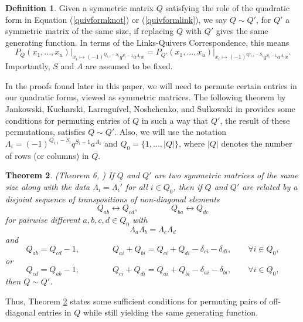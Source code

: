 \documentclass[11pt]{amsart}
\theoremstyle{plain}
\newtheorem{theoremN}{Theorem}[section]
\theoremstyle{definition}
\newtheorem{definitionN}[theoremN]{Definition}
\theoremstyle{remark}
\begin{document}
\begin{definitionN}
    Given a symmetric matrix $Q$ satisfying the role of the quadratic form in Equation (\ref{quivformknot}) or (\ref{quivformlink}), we say $Q\sim Q'$, for $Q'$ a symmetric matrix of the same size, if replacing $Q$ with $Q'$ gives the same generating function. In terms of the Links-Quivers Correspondence, this means
    \begin{equation}
     P_Q(x_1,...,x_u)\bigg|_{x_i\mapsto (-1)^{Q_{i,i}-S_i}q^{S_i-1}a^{A_i}x} = P_{Q'}(x_1,...,x_u)\bigg|_{x_i\mapsto (-1)^{Q'_{i,i}-S_i}q^{S_i-1}a^{A_i}x}.   
    \end{equation}
    Importantly, $S$ and $A$ are assumed to be fixed.
\end{definitionN}

In the proofs found later in this paper, we will need to permute certain entries in our quadratic forms, viewed as symmetric matrices.
The following theorem by Jankowski, Kucharski, Larragu\'ivel, Noshchenko, and Su\l{}kowski in \cite{JKLN21} provides some conditions for permuting entries of $Q$ in such a way that $Q'$, the result of these permutations, satisfies $Q\sim Q'$. Also, we will use the notation $\Lambda_i=(-1)^{Q_{i,i}-S_i}q^{S_i-1}a^{A_i}$ and $Q_0=\{1,...,|Q|\}$, where $|Q|$ denotes the number of rows (or columns) in $Q$.

\begin{theoremN}
\label{permthm}
    (Theorem 6, \cite{JKLN21}) If $Q$ and $Q'$ are two symmetric matrices of the same size along with the data $\Lambda_i=\Lambda_i'$ for all $i\in Q_0$, then if $Q$ and $Q'$ are related by a disjoint sequence of transpositions of non-diagonal elements
    \[
    Q_{ab}\leftrightarrow Q_{cd}, \qquad \qquad Q_{ba}\leftrightarrow Q_{dc}
    \]
    for pairwise different $a,b,c,d\in Q_0$ with
    \[
    \Lambda_a\Lambda_b=\Lambda_c\Lambda_d
    \]
    and 
    \[
    Q_{ab}=Q_{cd}-1, \qquad \qquad Q_{ai}+Q_{bi}=Q_{ci}+Q_{di}-\delta_{ci}-\delta_{di}, \qquad \forall i\in Q_0,
    \]
    or
    \[
    Q_{cd}=Q_{ab}-1, \qquad \qquad Q_{ci}+Q_{di}=Q_{ai}+Q_{bi}-\delta_{ai}-\delta_{bi}, \qquad \forall i\in Q_0,
    \]
    then $Q\sim Q'$.
\end{theoremN}

Thus, Theorem \ref{permthm} states some sufficient conditions for permuting pairs of off-diagonal entries in $Q$ while still yielding the same generating function.
\end{document}
